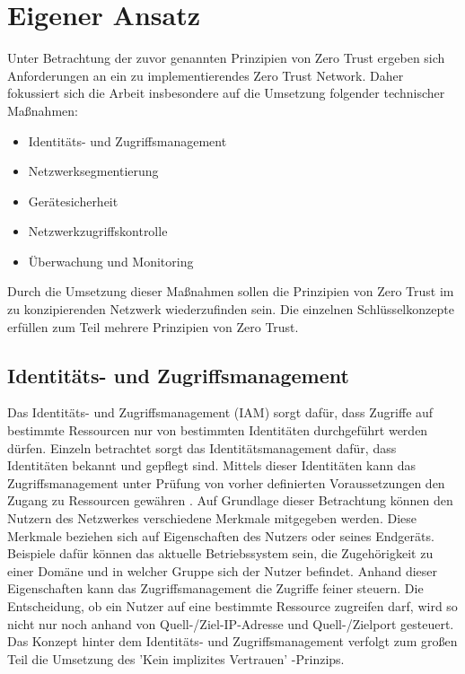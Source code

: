 \documentclass[lettersize,journal]{IEEEtran}
\begin{document}
\section{Eigener Ansatz}
Unter Betrachtung der zuvor genannten Prinzipien von Zero Trust ergeben sich Anforderungen an ein zu implementierendes Zero Trust Network. Daher fokussiert sich die Arbeit insbesondere auf die Umsetzung folgender technischer Maßnahmen:

\begin{itemize}
	\item Identitäts- und Zugriffsmanagement
	\item Netzwerksegmentierung
	\item Gerätesicherheit
	\item Netzwerkzugriffskontrolle
	\item Überwachung und Monitoring
\end{itemize}
Durch die Umsetzung dieser Maßnahmen sollen die Prinzipien von Zero Trust im zu konzipierenden Netzwerk wiederzufinden sein. Die einzelnen Schlüsselkonzepte erfüllen zum Teil mehrere Prinzipien von Zero Trust.

\subsection{Identitäts- und Zugriffsmanagement}
Das Identitäts- und Zugriffsmanagement (IAM) sorgt dafür, dass Zugriffe auf bestimmte Ressourcen nur von bestimmten Identitäten durchgeführt werden dürfen. Einzeln betrachtet sorgt das Identitätsmanagement dafür, dass Identitäten bekannt und gepflegt sind. Mittels dieser Identitäten kann das Zugriffsmanagement unter Prüfung von vorher definierten Voraussetzungen den Zugang zu Ressourcen gewähren \cite{Faber.2021}. Auf Grundlage dieser Betrachtung können den Nutzern des Netzwerkes verschiedene Merkmale mitgegeben werden. Diese Merkmale beziehen sich auf Eigenschaften des Nutzers oder seines Endgeräts. Beispiele dafür können das aktuelle Betriebssystem sein, die Zugehörigkeit zu einer Domäne und in welcher Gruppe sich der Nutzer befindet. Anhand dieser Eigenschaften kann das Zugriffsmanagement die Zugriffe feiner steuern. Die Entscheidung, ob ein Nutzer auf eine bestimmte Ressource zugreifen darf, wird so nicht nur noch anhand von Quell-/Ziel-IP-Adresse und Quell-/Zielport gesteuert. Das Konzept hinter dem Identitäts- und Zugriffsmanagement verfolgt zum großen Teil die Umsetzung des 'Kein implizites Vertrauen' -Prinzips.
\end{document}
